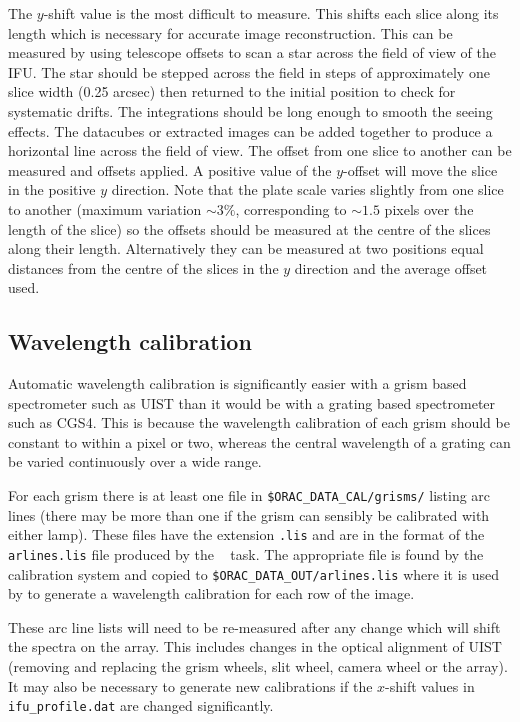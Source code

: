 \documentclass[twoside,11pt,nolof]{starlink}
\providecommand{\FIGARO}{\xref{{\sc{Figaro}}}{sun86}{}}
\begin{document}
The $y$-shift value is the most difficult to measure. This shifts each
slice along its length which is necessary for accurate image
reconstruction. This can be measured by using telescope offsets to
scan a star across the field of view of the IFU. The star should be
stepped across the field in steps of approximately one slice width
(0.25 arcsec) then returned to the initial position to check for
systematic drifts. The integrations should be long enough to smooth
the seeing effects.  The datacubes or extracted images can be added
together to produce a horizontal line across the field of view. The
offset from one slice to another can be measured and offsets applied.
A positive value of the $y$-offset will move the slice in the positive
$y$ direction. Note that the plate scale varies slightly from one
slice to another (maximum variation $\sim 3\%$, corresponding to $\sim
1.5$ pixels over the length of the slice) so the offsets should be
measured at the centre of the slices along their length. Alternatively
they can be measured at two positions equal distances from the centre
of the slices in the $y$ direction and the average offset used.





\subsection{Wavelength calibration}
\label{arclines}

Automatic wavelength calibration is significantly easier with a grism
based spectrometer such as UIST than it would be with a grating based
spectrometer such as CGS4. This is because the wavelength calibration of each
grism should be constant to within a pixel or two, whereas the central
wavelength of a grating can be varied continuously over a wide range.

For each grism there is at least one file in \texttt{\$ORAC\_DATA\_CAL/grisms/} listing arc lines (there may be more than
one if the grism can sensibly be calibrated with either lamp). These
files have the extension \texttt{.lis} and are in the format of the \texttt{arlines.lis} file produced by the \FIGARO\  task. The appropriate file is found by the
calibration system and copied to \texttt{\$ORAC\_DATA\_OUT/arlines.lis}
where it is used by  to generate a
wavelength calibration for each row of the image.

These arc line lists will need to be re-measured after any change
which will shift the spectra on the array. This includes changes in
the optical alignment of UIST (removing and replacing the grism
wheels, slit wheel, camera wheel or the array). It may also be
necessary to generate new calibrations if the $x$-shift values in \texttt{ifu\_profile.dat} are changed significantly.
\end{document}
